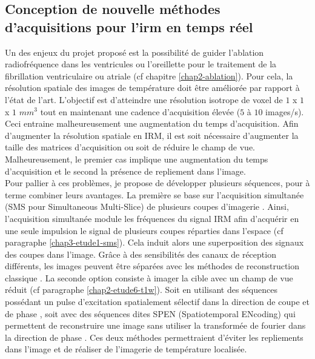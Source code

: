 \documentclass[10pt,a4paper]{report}
\begin{document}
\subsection{Conception de nouvelle méthodes d'acquisitions pour l'irm en temps réel}

Un des enjeux du projet proposé est la possibilité de guider l’ablation radiofréquence dans les ventricules ou l'oreillette pour le traitement de la fibrillation ventriculaire ou atriale (cf chapitre \ref{chap2-ablation}). Pour cela, la résolution spatiale des images de température doit être améliorée par rapport à l’état de l’art. L’objectif est d’atteindre une résolution isotrope de voxel de $1$ x $1$ x $1$ $mm^3$ tout en maintenant une cadence d’acquisition élevée ($5$ à $10$ images/s). Ceci entraine malheureusement une augmentation du temps d’acquisition. Afin d’augmenter la résolution spatiale en IRM, il est soit nécessaire d’augmenter la taille des matrices d’acquisition ou soit de réduire le champ de vue. Malheureusement, le premier cas implique une augmentation du temps d’acquisition et le second la présence de repliement dans l’image.\\

Pour pallier à ces problèmes, je propose de développer plusieurs séquences, pour à terme combiner leurs avantages. La première se base sur l’acquisition simultanée (SMS pour Simultaneous Multi-Slice) de plusieurs coupes d’imagerie \cite{larkman2001investigation,setsompop2012blipped}. Ainsi, l’acquisition simultanée module les fréquences du signal IRM afin d’acquérir en une seule impulsion le signal de plusieurs coupes réparties dans l’espace (cf paragraphe \ref{chap3-etude1-sms}). Cela induit alors une superposition des signaux des coupes dans l’image. Grâce à des sensibilités des canaux de réception différents, les images peuvent être séparées avec les méthodes de reconstruction classique \cite{breuer2005controlled}. La seconde option consiste à imager la cible avec un champ de vue réduit (cf paragraphe \ref{chap2-etude6-t1w}). Soit en utilisant des séquences possédant un pulse d’excitation spatialement sélectif dans la direction de coupe et de phase \cite{saritas2008dwi}, soit avec des séquences dites SPEN (Spatiotemporal ENcoding) qui permettent de reconstruire une image sans utiliser la transformée de fourier dans la direction de phase \cite{ben2010super}. Ces deux méthodes permettraient d’éviter les repliements dans l’image et de réaliser de l’imagerie de température localisée.\\
\end{document}
